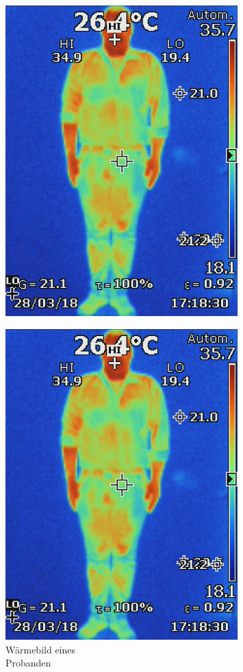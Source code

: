 \begin{figure}[H]
		\centering
	\begin{minipage}[b]{0.4\textwidth}
			\centering
\label{fig:Waermebild}
\includegraphics[width=0.8\textwidth]{fig/person_waerme.JPG}
\caption[Wäermebild eines \\Probanden]{Wärmebild eines \\Probanden}
	\end{minipage}
	\begin{minipage}[b]{0.2\textwidth}
\end{minipage}
	\begin{minipage}[b]{0.4\textwidth}
			\centering
\includegraphics[width=0.8\textwidth]{fig/person_waerme.JPG}

\end{minipage}
\end{figure}
